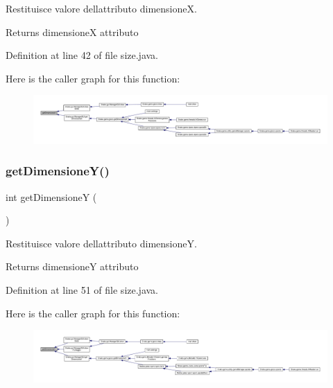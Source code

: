 Restituisce valore dell\textquotesingle{}attributo dimensioneX. 

\begin{DoxyReturn}{Returns}
dimensioneX attributo 
\end{DoxyReturn}


Definition at line 42 of file size.\+java.

Here is the caller graph for this function\+:
\nopagebreak
\begin{figure}[H]
\begin{center}
\leavevmode
\includegraphics[width=350pt]{class_snake_1_1gui_1_1size_a9e8362afc9e8ce68cca6528eb57869a2_icgraph}
\end{center}
\end{figure}
\mbox{\label{class_snake_1_1gui_1_1size_a2bb8f24fa464bafa5b480a95b8b738a8}} 
\subsubsection{\texorpdfstring{get\+Dimensione\+Y()}{getDimensioneY()}}
{\footnotesize\ttfamily int get\+DimensioneY (\begin{DoxyParamCaption}{ }\end{DoxyParamCaption})}



Restituisce valore dell\textquotesingle{}attributo dimensioneY. 

\begin{DoxyReturn}{Returns}
dimensioneY attributo 
\end{DoxyReturn}


Definition at line 51 of file size.\+java.

Here is the caller graph for this function\+:
\nopagebreak
\begin{figure}[H]
\begin{center}
\leavevmode
\includegraphics[width=350pt]{class_snake_1_1gui_1_1size_a2bb8f24fa464bafa5b480a95b8b738a8_icgraph}
\end{center}
\end{figure}


